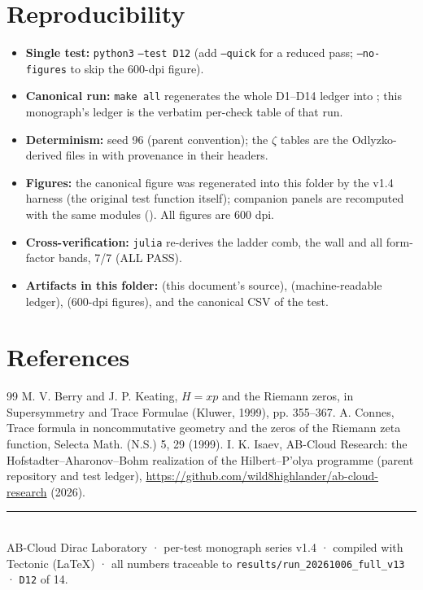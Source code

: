 \documentclass[11pt,a4paper]{article}
\begin{document}
\section{Reproducibility}
\begin{itemize}[leftmargin=1.2em, itemsep=0.15em]
\item \textbf{Single test:} \texttt{python3}  \texttt{--test D12} (add \texttt{--quick} for a reduced pass; \texttt{--no-figures} to skip the 600-dpi figure).
\item \textbf{Canonical run:} \texttt{make all} regenerates the whole D1--D14 ledger into ; this monograph's ledger is the verbatim per-check table of that run.
\item \textbf{Determinism:} seed 96 (parent convention); the $\zeta$ tables are the Odlyzko-derived files in  with provenance in their headers.
\item \textbf{Figures:} the canonical figure was regenerated into this folder by the v1.4 harness (the original test function itself); companion panels are recomputed with the same modules (). All figures are 600 dpi.
\item \textbf{Cross-verification:} \texttt{julia}  re-derives the ladder comb, the wall and all form-factor bands, 7/7 (ALL PASS).
\item \textbf{Artifacts in this folder:}  (this document's source),  (machine-readable ledger),  (600-dpi figures), and the canonical CSV of the test.
\end{itemize}

\section*{References}
\begin{thebibliography}{99}\small
{} M. V. Berry and J. P. Keating, $H = xp$ and the Riemann zeros, in Supersymmetry and Trace Formulae (Kluwer, 1999), pp. 355--367.
 A. Connes, Trace formula in noncommutative geometry and the zeros of the Riemann zeta function, Selecta Math. (N.S.) 5, 29 (1999).
 I. K. Isaev, AB-Cloud Research: the Hofstadter--Aharonov--Bohm realization of the Hilbert--P'olya programme (parent repository and test ledger), \url{https://github.com/wild8highlander/ab-cloud-research} (2026).
\end{thebibliography}

\vfill
\noindent\rule{\textwidth}{0.4pt}\\[0.2em]
{\footnotesize\color{labgray} AB-Cloud Dirac Laboratory · per-test monograph series v1.4 · compiled with Tectonic (LaTeX) · all numbers traceable to \texttt{results/run\_20261006\_full\_v13} · \texttt{D12} of 14.}
\end{document}
